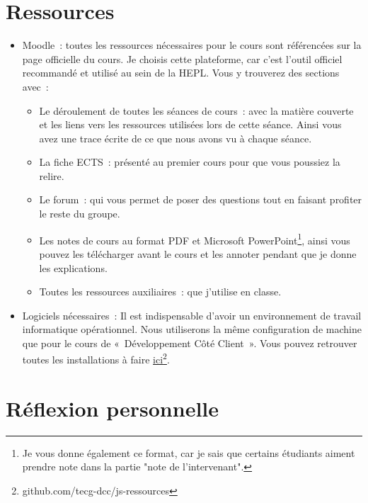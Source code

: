 \section{Ressources}
\begin{itemize}
    \item Moodle~: toutes les ressources nécessaires pour le cours sont référencées sur la page officielle du cours. Je choisis cette plateforme, car c'est l'outil officiel recommandé et utilisé au sein de la HEPL. Vous y trouverez des sections avec~:
          \begin{itemize}
              \item Le déroulement de toutes les séances de cours~: avec la matière couverte et les liens vers les ressources utilisées lors de cette séance. Ainsi vous avez une trace écrite de ce que nous avons vu à chaque séance.
              \item La fiche ECTS~: présenté au premier cours pour que vous poussiez la relire.
              \item Le forum~: qui vous permet de poser des questions tout en faisant profiter le reste du groupe.
              \item Les notes de cours au format PDF et Microsoft PowerPoint\footnote{Je vous donne également ce format, car je sais que certains étudiants aiment prendre note dans la partie "note de l'intervenant".}, ainsi vous pouvez les télécharger avant le cours et les annoter pendant que je donne les explications.
              \item Toutes les ressources auxiliaires~: que j'utilise en classe.
          \end{itemize}
    \item Logiciels nécessaires~: Il est indispensable d'avoir un environnement de travail informatique opérationnel. Nous utiliserons la même configuration de machine que pour le cours de «~Développement Côté Client~». Vous pouvez retrouver toutes les installations à faire \href{https://github.com/tecg-dcc/js-ressources#environnement-de-travail}{ici}\footnote{github.com/tecg-dcc/js-ressources}.
\end{itemize}
\clearpage
\section*{Réflexion personnelle}

